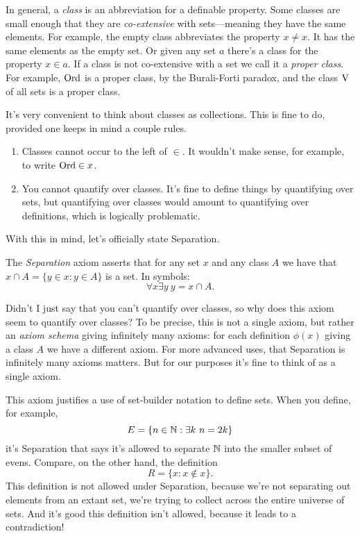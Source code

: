 \documentclass[10pt]{amsart}
\begin{document}
In general, a \emph{class} is an abbreviation for a definable property. Some classes are small enough that they are \emph{co-extensive} with sets---meaning they have the same elements. For example, the empty class abbreviates the property $x \ne x$. It has the same elements as the empty set. Or given any set $a$ there's a class for the property $x \in a$. If a class is not co-extensive with a set we call it a \emph{proper class}. For example, $\mathrm{Ord}$ is a proper class, by the Burali-Forti paradox, and the class $\mathrm{V}$ of all sets is a proper class.

\begin{remark}
It's very convenient to think about classes as collections. This is fine to do, provided one keeps in mind a couple rules.
\begin{enumerate}
\item Classes cannot occur to the left of $\in$. It wouldn't make sense, for example, to write $\mathrm{Ord} \in x$.
\item You cannot quantify over classes. It's fine to define things by quantifying over sets, but quantifying over classes would amount to quantifying over definitions, which is logically problematic.
\end{enumerate}
\end{remark}

With this in mind, let's officially state Separation.

\begin{definition}
The \emph{Separation} axiom asserts that for any set $x$ and any class $A$ we have that $x \cap A = \{ y \in x : y \in A \}$ is a set. In symbols:
\[
\tag{Separation}
\forall x \exists y\ y = x \cap A.
\]
\end{definition}

\begin{remark}
Didn't I just say that you can't quantify over classes, so why does this axiom seem to quantify over classes? To be precise, this is not a single axiom, but rather an \emph{axiom schema} giving infinitely many axioms: for each definition $\phi(x)$ giving a class $A$ we have a different axiom. For more advanced uses, that Separation is infinitely many axioms matters. But for our purposes it's fine to think of as a single axiom.
\end{remark}

This axiom justifies a use of set-builder notation to define sets. When you define, for example, 
\[
E = \{ n \in \mathbb{N} : \exists k\ n = 2k \}
\]
it's Separation that says it's allowed to separate $\mathbb{N}$ into the smaller subset of evens. Compare, on the other hand, the definition
\[
R = \{ x : x \not \in x \}.
\]
This definition is not allowed under Separation, because we're not separating out elements from an extant set, we're trying to collect across the entire universe of sets. And it's good this definition isn't allowed, because it leads to a contradiction!
\end{document}
